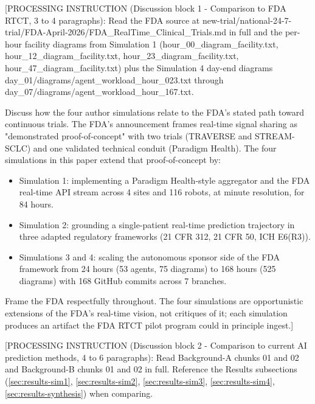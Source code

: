 
[PROCESSING INSTRUCTION (Discussion block 1 - Comparison to FDA RTCT, 3
to 4 paragraphs): Read the FDA source at
new-trial/national-24-7-trial/FDA-April-2026/FDA\_RealTime\_Clinical\_Trials.md
in full and the per-hour facility diagrams from Simulation 1
(hour\_00\_diagram\_facility.txt, hour\_12\_diagram\_facility.txt,
hour\_23\_diagram\_facility.txt, hour\_47\_diagram\_facility.txt) plus the
Simulation 4 day-end diagrams day\_01/diagrams/agent\_workload\_hour\_023.txt
through day\_07/diagrams/agent\_workload\_hour\_167.txt.

Discuss how the four author simulations relate to the FDA's stated path
toward continuous trials. The FDA's announcement frames real-time signal
sharing as "demonstrated proof-of-concept" with two trials (TRAVERSE and
STREAM-SCLC) and one validated technical conduit (Paradigm Health). The
four simulations in this paper extend that proof-of-concept by:
\begin{itemize}[leftmargin=*]
\item Simulation 1: implementing a Paradigm Health-style aggregator and
the FDA real-time API stream across 4 sites and 116 robots, at minute
resolution, for 84 hours.
\item Simulation 2: grounding a single-patient real-time prediction
trajectory in three adapted regulatory frameworks (21 CFR 312, 21 CFR 50,
ICH E6(R3)).
\item Simulations 3 and 4: scaling the autonomous sponsor side of the
FDA framework from 24 hours (53 agents, 75 diagrams) to 168 hours (525
diagrams) with 168 GitHub commits across 7 branches.
\end{itemize}
Frame the FDA respectfully throughout. The four simulations are
opportunistic extensions of the FDA's real-time vision, not critiques of
it; each simulation produces an artifact the FDA RTCT pilot program could
in principle ingest.]

[PROCESSING INSTRUCTION (Discussion block 2 - Comparison to current AI
prediction methods, 4 to 6 paragraphs): Read Background-A chunks 01 and
02 and Background-B chunks 01 and 02 in full. Reference the Results
subsections (\ref{sec:results-sim1}, \ref{sec:results-sim2},
\ref{sec:results-sim3}, \ref{sec:results-sim4}, \ref{sec:results-synthesis})
when comparing.

